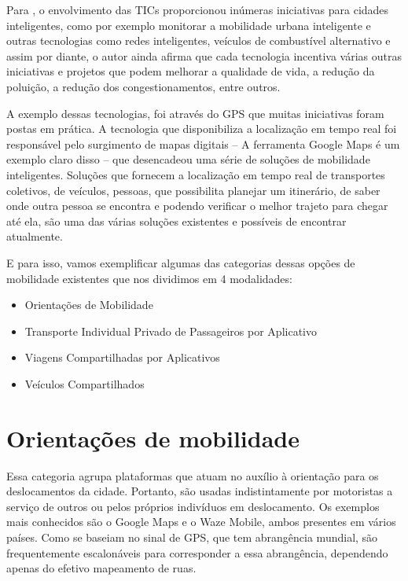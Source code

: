 Para , o envolvimento das TICs proporcionou inúmeras iniciativas para cidades inteligentes, como por exemplo monitorar a mobilidade urbana inteligente e outras tecnologias como redes inteligentes, veículos de combustível alternativo e assim por diante, o autor ainda afirma que cada tecnologia incentiva várias outras iniciativas e projetos que podem melhorar a qualidade de vida, a redução da poluição, a redução dos congestionamentos, entre outros.

A exemplo dessas tecnologias, foi através do GPS que muitas iniciativas foram postas em prática. A tecnologia  que disponibiliza a localização em tempo real foi responsável pelo surgimento de mapas digitais -- A ferramenta Google Maps é um exemplo claro disso -- que desencadeou uma série de soluções de mobilidade inteligentes. Soluções que fornecem a localização em tempo real de transportes coletivos, de veículos, pessoas, que possibilita planejar um itinerário, de saber onde outra pessoa se encontra e podendo verificar o melhor trajeto para chegar até ela, são uma das várias soluções existentes e possíveis de encontrar atualmente.

E para isso, vamos exemplificar algumas das categorias dessas opções de mobilidade existentes que nos  dividimos em 4 modalidades:
\begin{itemize}
	\item Orientações de Mobilidade
	\item Transporte Individual Privado de Passageiros por Aplicativo
	\item Viagens Compartilhadas por Aplicativos
	\item Veículos Compartilhados
\end{itemize}

\section{Orientações de mobilidade}

Essa categoria agrupa plataformas que atuam no auxílio à orientação para os deslocamentos da cidade. Portanto, são usadas indistintamente por motoristas a serviço de outros ou pelos próprios indivíduos em deslocamento. Os exemplos mais conhecidos são o Google Maps e o Waze Mobile, ambos presentes em vários países. Como se baseiam no sinal de GPS, que tem
abrangência mundial, são frequentemente escalonáveis para corresponder a essa abrangência,
dependendo apenas do efetivo mapeamento de ruas. \cite{caronae}

